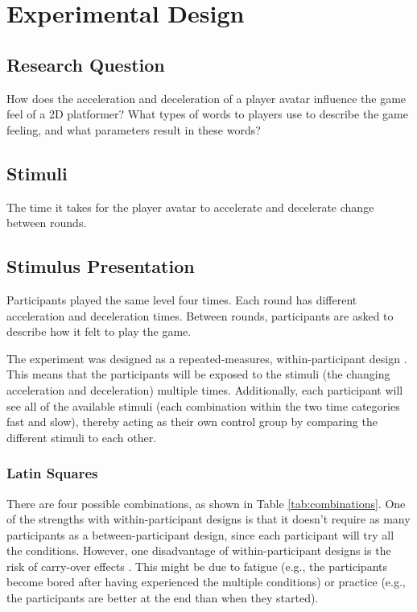 \section{Experimental Design} \label{experimentalDesign}
\subsection{Research Question}
How does the acceleration and deceleration of a player avatar influence the game feel of a 2D platformer? What types of words to players use to describe the game feeling, and what parameters result in these words?

\subsection{Stimuli}
The time it takes for the player avatar to accelerate and decelerate change between rounds.

\subsection{Stimulus Presentation}
Participants played the same level four times. Each round has different acceleration and deceleration times. Between rounds, participants are asked to describe how it felt to play the game.

The experiment was designed as a repeated-measures, within-participant design \cite{cunningham}. This means that the participants will be exposed to the stimuli (the changing acceleration and deceleration) multiple times. Additionally, each participant will see all of the available stimuli (each combination within the two time categories fast and slow), thereby acting as their own control group by comparing the different stimuli to each other.

\subsubsection{Latin Squares} \label{latinSection}
There are four possible combinations, as shown in Table \ref{tab:combinations}. One of the strengths with within-participant designs is that it doesn't require as many participants as a between-participant design, since each participant will try all the conditions. However, one disadvantage of within-participant designs is the risk of carry-over effects \cite{experimental1}. This might be due to fatigue (e.g., the participants become bored after having experienced the multiple conditions) or practice (e.g., the participants are better at the end than when they started).

